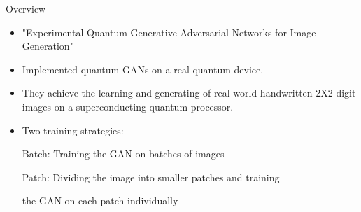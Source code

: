 
\begin{frame}{Overview}
\begin{itemize}
    \item "Experimental Quantum Generative Adversarial Networks for Image Generation"
    \item Implemented quantum GANs on a real quantum device. 
    
    \item They achieve the learning and generating of real-world 
    \hspace{0.4cm} handwritten 2X2 digit images on a superconducting \hspace{0.4cm} quantum processor.

\item Two training strategies: 

    Batch: Training the GAN on batches of images
    
    Patch: Dividing the image into smaller patches and training 
    
    \hspace{1.1cm} the GAN on each patch individually
    
\end{itemize}
\end{frame}
